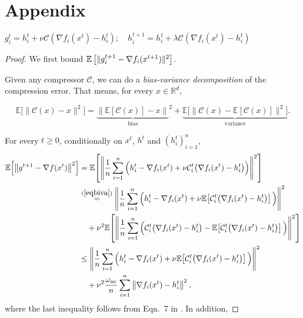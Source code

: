 \documentclass{article} %
\theoremstyle{plain}
\theoremstyle{definition}
\theoremstyle{remark}
\newcommand{\C}{\mathcal{C}}
\newcommand{\sqnorm}[1]{\left\| #1 \right\|^2}
\newcommand{\Exp}[1]{\mathbb{E}\!\left[ #1 \right]}
\newcommand{\oma}{\omega_{\mathrm{av}}}
\begin{document}



\newpage
\appendix
\section{Appendix}
$g_i^t = h_i^t + \nu \C(\nabla f_i (x^t) - h_i^t); \quad h_i^{t+1} = h_i^t + \lambda \C(\nabla f_i (x^t) - h_i^t)$

\begin{proof}
   We first bound $\mathbb{E}\left[\|g_i^{t+1} - \nabla f_i(x^{t+1})\|^2\right]$. 

   Given any compressor $\mathcal{C}$, we can do a {\it bias-variance decomposition} of the compression error. That means, for every $x\in\mathbb{R}^d$,

   \begin{equation}
    \mathbb{E}\big[\|\mathcal{C}(x)-x\|^2\big] = {\underbrace{\big\| \mathbb{E}[\mathcal{C}(x)]-x\big\|}_{\text{bias}}}^2 + \underbrace{\mathbb{E}\Big[\big\|\mathcal{C}(x)-\mathbb{E}[\mathcal{C}(x)]\big\|^2\Big]}_{\text{variance}}.\label{eqbiva}
    \end{equation}

   For every $t\geq 0$, conditionally on $x^t$, $h^t$ and $(h_i^t)_{i=1}^n$, 
   \begin{align*}
      \Exp{\sqnorm{g^{t+1}-\nabla f(x^t)}} &=\Exp{\sqnorm{\frac{1}{n}\sum_{i=1}^n \Big(h_i^{t}-\nabla f_i(x^t) +\nu \mathcal{C}_i^t\big(\nabla f_i(x^t)-h_i^t\big) \Big) }}\\
      &\stackrel{(\ref{eqbiva})}{=}\sqnorm{\frac{1}{n}\sum_{i=1}^n \Big(h_i^{t}-\nabla f_i(x^t) +\nu \Exp{\mathcal{C}_i^t\big(\nabla f_i(x^t)-h_i^t\big)} \Big)}\\
      &\quad+\nu^2\Exp{\sqnorm{\frac{1}{n}\sum_{i=1}^n \Big( \mathcal{C}_i^t\big(\nabla f_i(x^t)-h_i^t\big)-\Exp{ \mathcal{C}_i^t\big(\nabla f_i(x^t)-h_i^t\big) } \Big) }}\\
      &\leq \sqnorm{\frac{1}{n}\sum_{i=1}^n \Big(h_i^{t}-\nabla f_i(x^t) +\nu \Exp{\mathcal{C}_i^t\big(\nabla f_i(x^t)-h_i^t\big)} \Big)}\\
      &\quad+\nu^2 \frac{\oma}{n}\sum_{i=1}^n \sqnorm{\nabla f_i(x^t)-h_i^t },
   \end{align*}
   where the last inequality follows from Eqn.~7 in \cite{condat2022ef}. In addition,
 

\end{proof}
\end{document}

